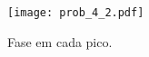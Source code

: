 \documentclass[12pt,portuguese,a4paper,pdftex]{article}
\renewcommand{\baselinestretch}{1.5}
\begin{document}
\vspace{-0.5cm}

\begin{figure}[ht]
\begin{center}
\texttt{[image: prob\_4\_2.pdf]}
\end{center}
\vspace{-0.5cm}
\renewcommand{\baselinestretch}{.5}
\caption{\label{fig:prob_4_2} \small{Fase em cada pico.}}
\end{figure}

\newpage

% 
% 
% 
% 
%
%

\end{document}
